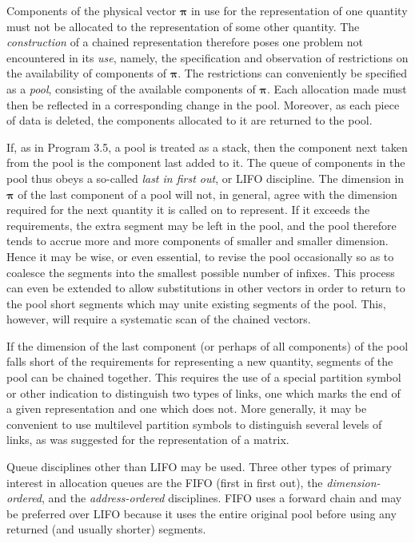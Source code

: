 {\par Components of the physical vector $\mathbf{π}$ in use for the representation of one quantity must not be allocated to the representation of some other quantity. The \textit{construction} of a chained representation therefore poses one problem not encountered in its \textit{use}, namely, the specification and observation of restrictions on the availability of components of $\mathbf{π}$. The restrictions can conveniently be specified as a \textit{pool}, consisting of the available components of $\mathbf{π}$. Each allocation made must then be reflected in a corresponding change in the pool. Moreover, as each piece of data is deleted, the components allocated to it are returned to the pool.

\par If, as in Program 3.5, a pool is treated as a stack, then the component next taken from the pool is the component last added to it. The queue of components in the pool thus obeys a so-called \textit{last in first out}, or LIFO discipline. The dimension in $\mathbf{π}$ of the last component of a pool will not, in general, agree with the dimension required for the next quantity it is called on to represent. If it exceeds the requirements, the extra segment may be left in the pool, and the pool therefore tends to accrue more and more components of smaller and smaller dimension. Hence it may be wise, or even essential, to revise the pool occasionally so as to coalesce the segments into the smallest possible number of infixes. This process can even be extended to allow substitutions in other vectors in order to return to the pool short segments which may unite existing segments of the pool. This, however, will require a systematic scan of the chained vectors.

\par If the dimension of the last component (or perhaps of all components) of the pool falls short of the requirements for representing a new quantity, segments of the pool can be chained together. This requires the use of a special partition symbol or other indication to distinguish two types of links, one which marks the end of a given representation and one which does not. More generally, it may be convenient to use multilevel partition symbols to distinguish several levels of links, as was suggested for the representation of a matrix.

\par Queue disciplines other than LIFO may be used. Three other types of primary interest in allocation queues are the FIFO (first in first out), the \textit{dimension-ordered}, and the \textit{address-ordered} disciplines. FIFO uses a forward chain and may be preferred over LIFO because it uses the entire original pool before using any returned (and usually shorter) segments.

}

